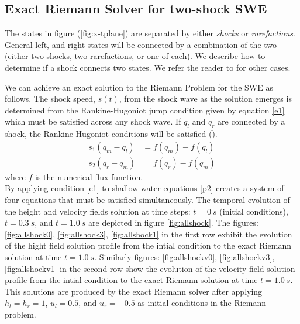 \documentclass[10pt,a4paper]{article}
\begin{document}
	

	\subsection{Exact Riemann Solver for two-shock SWE}
The states in figure (\ref{fig:x-tplane}) are separated by either {\em shocks} or {\em rarefactions}. General left, and right states will be connected by a combination of the two (either two shocks, two rarefactions, or one of each).  We describe how to determine if a shock connects two states.  We refer the reader to \citet{leveque2002finite} for other cases. 

We can achieve an exact solution to the Riemann Problem for the SWE as follows. 
The shock speed, $s(t)$,  from the shock wave as the solution emerges is determined from the Rankine-Hugoniot jump condition given by equation \eqref{e1}  which must be satisfied across any shock wave.  If $q_l$ and $q_r$ are connected by a shock, the Rankine Hugoniot conditions will be satisfied (\cite{leveque2002finite,toro2001shock}).
	\begin{equation}
		\begin{aligned}
			s_1(q_{m} - q_{l}) & = f(q_{m}) - f(q_{l}) \\
			s_2(q_{r} - q_{m}) & = f(q_{r}) - f(q_{m})
		\end{aligned}
		\label{e1}
	\end{equation}
where $f$ is the numerical flux function. \\

By applying condition  \eqref{e1} to shallow water equations \eqref{p2}  creates a system of four equations that must be satisfied simultaneously. The temporal evolution of the height and velocity fields solution at time steps: $t=0~s$ (initial conditions), $t = 0.3~s$, and $t = 1.0~s$ are  depicted in figure \ref{fig:allshock}. The figures: \ref{fig:allshock0}, \ref{fig:allshock3}, \ref{fig:allshock1} in the first row exhibit the evolution of the hight field solution profile from the intial condition to the exact Riemann solution at time $t = 1.0~s$. Similarly figures: \ref{fig:allshockv0}, \ref{fig:allshockv3}, \ref{fig:allshockv1} in the second row show the evolution of the velocity field solution profile from the intial condition to the exact Riemann solution at time $t = 1.0~s$. This solutions are produced by the exact Riemann solver after applying $h_l = h_r = 1$, $u_l  =  0.5$, and $u_r = -0.5$ as initial conditions in  the Riemann problem.
	
\end{document}
